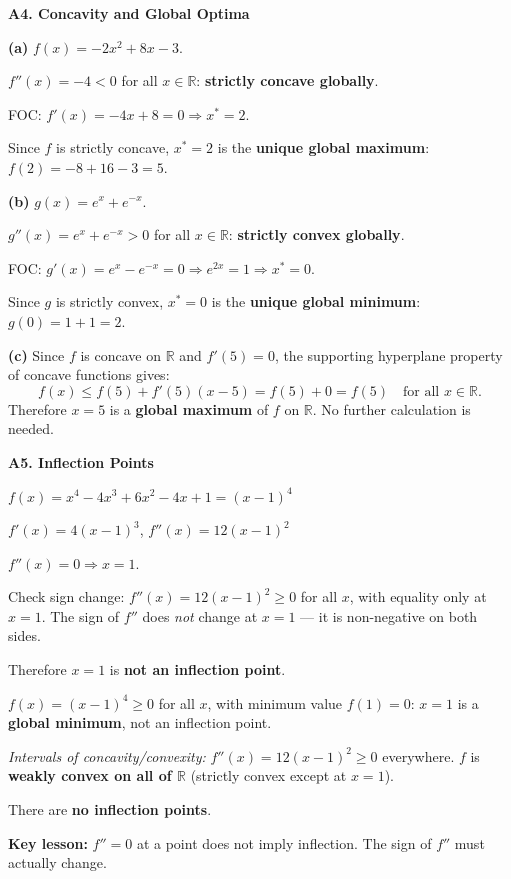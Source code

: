\documentclass[12pt, a4paper]{article}
\theoremstyle{definition}
\newcommand{\R}{\mathbb{R}}
\begin{document}
\begin{solbox}
\textbf{A4. Concavity and Global Optima}

\textbf{(a)} $f(x)=-2x^2+8x-3$.

$f''(x)=-4<0$ for all $x\in\R$: \textbf{strictly concave globally}.

FOC: $f'(x)=-4x+8=0\Rightarrow x^*=2$.

Since $f$ is strictly concave, $x^*=2$ is the \textbf{unique global maximum}:
$f(2)=-8+16-3=5$.

\medskip
\textbf{(b)} $g(x)=e^x+e^{-x}$.

$g''(x)=e^x+e^{-x}>0$ for all $x\in\R$: \textbf{strictly convex globally}.

FOC: $g'(x)=e^x-e^{-x}=0\Rightarrow e^{2x}=1\Rightarrow x^*=0$.

Since $g$ is strictly convex, $x^*=0$ is the \textbf{unique global minimum}:
$g(0)=1+1=2$.

\medskip
\textbf{(c)} Since $f$ is concave on $\R$ and $f'(5)=0$, the supporting
hyperplane property of concave functions gives:
\[
  f(x) \leq f(5) + f'(5)(x-5) = f(5) + 0 = f(5) \quad \text{for all } x\in\R.
\]
Therefore $x=5$ is a \textbf{global maximum} of $f$ on $\R$.
No further calculation is needed.
\end{solbox}

\begin{solbox}
\textbf{A5. Inflection Points}

$f(x)=x^4-4x^3+6x^2-4x+1 = (x-1)^4$

$f'(x) = 4(x-1)^3$, \quad $f''(x)=12(x-1)^2$

$f''(x)=0\Rightarrow x=1$.

Check sign change: $f''(x)=12(x-1)^2\geq 0$ for all $x$, with equality only
at $x=1$.  The sign of $f''$ does \emph{not} change at $x=1$ --- it is
non-negative on both sides.

Therefore $x=1$ is \textbf{not an inflection point}.

$f(x)=(x-1)^4\geq 0$ for all $x$, with minimum value $f(1)=0$: $x=1$ is a
\textbf{global minimum}, not an inflection point.

\emph{Intervals of concavity/convexity:} $f''(x)=12(x-1)^2\geq 0$ everywhere.
$f$ is \textbf{weakly convex on all of $\R$} (strictly convex except at $x=1$).

There are \textbf{no inflection points}.

\textbf{Key lesson:} $f''=0$ at a point does not imply inflection.
The sign of $f''$ must actually change.
\end{solbox}
\end{document}
